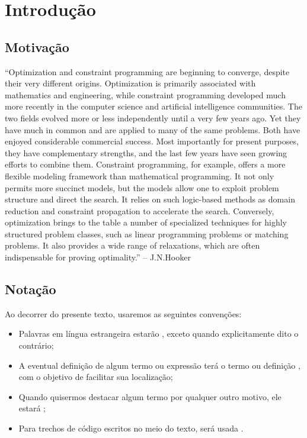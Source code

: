 \documentclass{article}
\begin{document}
\setcounter{tocdepth}{5} %

\tableofcontents

\section*{Introdução}

\subsection*{Motivação}

``Optimization and constraint programming are beginning to converge,
despite their very different origins. Optimization is primarily
associated with mathematics and engineering, while constraint
programming developed much more recently in the computer science and
artificial intelligence communities. The two fields evolved more or
less independently until a very few years ago. Yet they have much in
common and are applied to many of the same problems. Both have enjoyed
considerable commercial success. Most importantly for present
purposes, they have complementary strengths, and the last few years
have seen growing efforts to combine them. Constraint programming, for
example, offers a more flexible modeling framework than mathematical
programming. It not only permits more succinct models, but the models
allow one to exploit problem structure and direct the search. It
relies on such logic-based methods as domain reduction and constraint
propagation to accelerate the search.  Conversely, optimization brings
to the table a number of specialized techniques for highly structured
problem classes, such as linear programming problems or matching
problems. It also provides a wide range of relaxations, which are
often indispensable for proving optimality.'' -- J.N.Hooker

\subsection*{Notação}
  Ao decorrer do presente texto, usaremos as seguintes convenções:

  \begin{itemize}
    \item Palavras em língua estrangeira estarão ,
      exceto quando explicitamente dito o contrário;
    \item A eventual definição de algum termo ou expressão terá o
      termo ou definição , com o objetivo de
      facilitar sua localização;
    \item Quando quisermos destacar algum termo por qualquer outro
      motivo, ele estará ;
    \item Para trechos de código escritos no meio do texto, será usada
      .
  \end{itemize}
\end{document}
